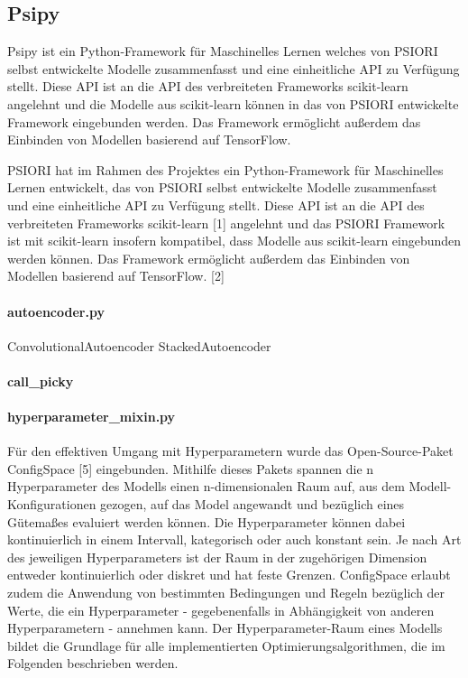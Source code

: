		
		\subsection{Psipy}
		\label{subsec:Psipy}
			Psipy ist ein Python-Framework für Maschinelles Lernen welches von PSIORI selbst entwickelte Modelle zusammenfasst und eine einheitliche API zu Verfügung stellt. Diese API ist an die API des verbreiteten Frameworks scikit-learn angelehnt und die Modelle aus scikit-learn können in das von PSIORI entwickelte Framework eingebunden werden. Das Framework ermöglicht außerdem das Einbinden von Modellen basierend auf TensorFlow.\grqq [PSIORI]
			
			PSIORI hat im Rahmen des Projektes ein Python-Framework für Maschinelles Lernen entwickelt, das von PSIORI selbst entwickelte Modelle zusammenfasst und eine einheitliche API zu Verfügung stellt. Diese API ist an die API des verbreiteten Frameworks scikit-learn [1] angelehnt und das PSIORI Framework ist mit scikit-learn insofern kompatibel, dass Modelle aus scikit-learn eingebunden werden können. Das Framework ermöglicht außerdem das Einbinden von Modellen basierend auf TensorFlow. [2]
			
		\paragraph{autoencoder.py}
			ConvolutionalAutoencoder 
			StackedAutoencoder
		\paragraph{call\_picky}
		\paragraph{hyperparameter\_mixin.py} 
		
		Für den effektiven Umgang mit Hyperparametern wurde das Open-Source-Paket ConfigSpace [5] eingebunden. Mithilfe dieses Pakets spannen die n Hyperparameter des Modells einen n-dimensionalen Raum auf, aus dem Modell-Konfigurationen gezogen, auf das Model angewandt und bezüglich eines Gütemaßes evaluiert werden können. Die Hyperparameter können dabei kontinuierlich in einem Intervall, kategorisch oder auch konstant sein. Je nach Art des jeweiligen Hyperparameters ist der Raum in der zugehörigen Dimension entweder kontinuierlich oder diskret und hat feste Grenzen. ConfigSpace erlaubt zudem die Anwendung von bestimmten Bedingungen und Regeln bezüglich der Werte, die ein Hyperparameter - gegebenenfalls in Abhängigkeit von anderen Hyperparametern - annehmen kann. Der Hyperparameter-Raum eines Modells bildet die Grundlage für alle implementierten Optimierungsalgorithmen, die im Folgenden beschrieben werden.
		
